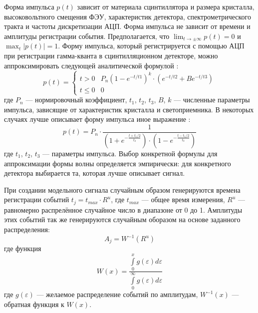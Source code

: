 Форма импульса $p(t)$ зависит от материала сцинтиллятора и размера кристалла, высоковольтного смещения ФЭУ, характеристик детектора, спектрометрического тракта и частоты дискретизации АЦП. Форма импульса не зависит от времени и амплитуды регистрации события. Предполагается, что $\lim_{t \to \pm \infty} p(t) = 0$ и $\max_{t} | p(t)| = 1$. Форму импульса, который регистрируется с помощью АЦП при регистрации гамма-кванта в сцинтилляционном детекторе, можно аппроксимировать следующей аналитической формулой \cite{Gin2008,Shevelev2004,Shevelev2016,Khilkevitch2020}:
\begin{equation}
  \label{eq:PulseShape}
  p(t) = \begin{cases} 
    t > 0   & P_n \left( 1 - e^{-t/t1} \right)^k \cdot \left( e^{-t/t2} + B e^{-t/t3} \right) \\ 
            t \le 0 & 0
         \end{cases}
\end{equation}
где $P_n$ --- нормировочный коэффициент, $t_1$, $t_2$, $t_3$, $B$, $k$ --- численные параметры импульса, зависящие от характеристик кристалла и светоприемника. В некоторых случаях лучше описывает форму импульса иное выражение \cite{Khilkevitch2020}: 
\begin{equation*}
  p(t) = P_n \cdot \frac{1}{ \left( 1 + e^{-\frac{t + t_1/2}{t_2}} \right) \cdot \left( 1 - e^{-\frac{t - t_1/2}{t_3}} \right) }
\end{equation*}
где $t_1$, $t_2$, $t_3$ --- параметры импульса. Выбор конкретной формулы для аппроксимации формы волны определяется эмпирически: для конкретного детектора выбирается та, которая лучше описывает сигнал. 

При создании модельного сигнала случайным образом генерируются времена регистрации событий $t_j = t_{max} \cdot R^u$, где  $t_{max}$ --- общее время измерения, $R^u$ --- равномерно распрелённое случайное число в диапазоне от 0 до 1. Амплитуды этих событий так же генерируются случайным оборазом на основе заданного распределения:
\begin{equation*}
  A_j = W^{-1}(R^u)
\end{equation*}
где функция
\begin{equation*}
  W(x) = \frac{ \int\limits_0^{x} g(\varepsilon) d\varepsilon }{ \int\limits_0^{\infty} g(\varepsilon) d\varepsilon }
\end{equation*}
где $g(\varepsilon)$ --- желаемое распределение событий по амплитудам, $W^{-1}(x)$ --- обратная функция к $W(x)$.


